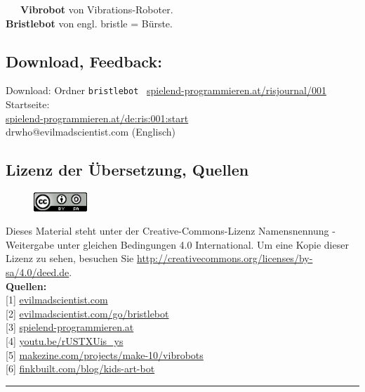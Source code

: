 \documentclass[10pt,a4paper,ngerman,twoside]{article} %
\newcommand{\SepRule}{\noindent	%
\begin{center}
\rule{250pt}{1pt} %
\end{center}
}
\begin{document}
\begin{multicols}{3}
~~~\textbf{Vibrobot} von Vibrations-Roboter. \\

\textbf{Bristlebot} von engl. bristle = Bürste. \\

\newpage
\subsection*{Download, Feedback:}
\footnotesize{
Download: Ordner \texttt{bristlebot} \Mundus\ \href{http://spielend-programmieren.at/risjournal/001}{spielend-programmieren.at/risjournal/001}\\
Startseite:\\
\href{http://spielend-programmieren.at/de:ris:001:start}{spielend-programmieren.at/de:ris:001:start}\\ 
\Letter\:  drwho@evilmadscientist.com (Englisch) \\}
\normalsize
 

\subsection*{Lizenz der Übersetzung, Quellen}
\begin{figure}
\includegraphics[width=2cm]{ccbysa88x31.png}
\end{figure}
Dieses Material steht unter der Creative-Commons-Lizenz Namensnennung - Weitergabe unter gleichen Bedingungen 4.0 International. Um eine Kopie dieser Lizenz zu sehen, besuchen Sie \url{http://creativecommons.org/licenses/by-sa/4.0/deed.de}. \\

\textbf{Quellen:}\\
{[}1{]} \href{http://www.evilmadscientist.com/about/}{evilmadscientist.com} \\
{[}2{]} \href{http://www.evilmadscientist.com/go/bristlebot}{evilmadscientist.com/go/bristlebot} \\
{[}3{]} \href{http://spielend-programmieren.at}{spielend-programmieren.at} \\
{[}4{]} \href{http://youtu.be/rUSTXUis_ys}{youtu.be/rUSTXUis\_ys} \\
{[}5{]} \href{http://makezine.com/projects/make-10/vibrobots/}{makezine.com/projects/make-10/vibrobots} \\
{[}6{]} \href{http://www.finkbuilt.com/blog/kids-art-bot/}{finkbuilt.com/blog/kids-art-bot} 

\end{multicols}
\SepRule
\end{document}
